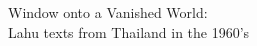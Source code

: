 \chapter*{}
\vspace{10em}
\thispagestyle{empty}
\begin{center}
{\fontsize{36}{36}\selectfont Window onto a Vanished World: \\
Lahu
  texts from Thailand in the 1960’s}
\end{center}